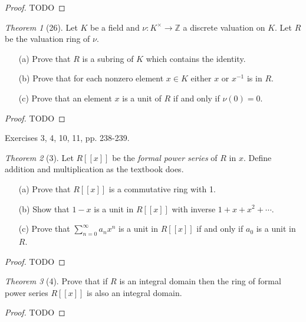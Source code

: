 \documentclass[12pt]{article}
\theoremstyle{remark}
\theoremstyle{named}
\newtheorem*{theorem}{Theorem}
\newcommand{\Z}{\mathbb Z}
\begin{document}
\begin{proof}
    TODO
\end{proof}

\begin{theorem}[26]
    Let \(K\) be a field and \(\nu : K^\times \to \Z\) a discrete valuation on \(K\). Let \(R\) be the valuation ring of \(\nu\).
    \begin{enumerate}
        \item[(a)] Prove that \(R\) is a subring of \(K\) which contains the identity.
        \item[(b)] Prove that for each nonzero element \(x \in K\) either \(x\) or \(x^{-1}\) is in \(R\). 
        \item[(c)] Prove that an element \(x\) is a unit of \(R\) if and only if \(\nu(0) = 0\).
    \end{enumerate}
\end{theorem}

\begin{proof}
    TODO
\end{proof}

Exercises 3, 4, 10, 11, pp. 238-239.

\begin{theorem}[3]
    Let \(R[[x]]\) be the \textit{formal power series} of \(R\) in \(x\). Define addition and multiplication as the textbook does.
    \begin{enumerate}
        \item[(a)] Prove that \(R[[x]]\) is a commutative ring with 1.
        \item[(b)] Show that \(1 - x\) is a unit in \(R[[x]]\) with inverse \(1 + x + x^2 + \cdots\).
        \item[(c)] Prove that \(\sum_{n = 0}^\infty a_n x^n\) is a unit in \(R[[x]]\) if and only if \(a_0\) is a unit in \(R\).
    \end{enumerate}
\end{theorem}

\begin{proof}
    TODO
\end{proof}

\begin{theorem}[4]
    Prove that if \(R\) is an integral domain then the ring of formal power series \(R[[x]]\) is also an integral domain.
\end{theorem}

\begin{proof}
    TODO
\end{proof}
\end{document}
